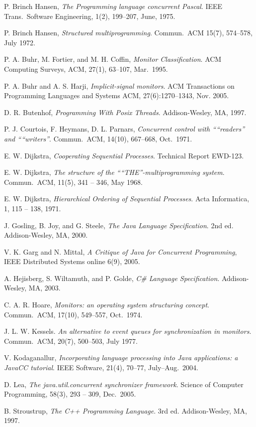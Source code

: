 \documentclass[preprint]{sigplanconf}
\begin{document}
\begin{thebibliography}{}
\softraggedright

  P. Brinch Hansen, \emph{The Programming language concurrent Pascal}. IEEE
  Trans.~Software Engineering, 1(2), 199--207, June, 1975.

    P. Brinch Hansen, \emph{Structured multiprogramming}. Commun.~ACM 15(7),
    574--578, July 1972.

  P. A. Buhr, M. Fortier, and M. H. Coffin, \emph{Monitor Classification}. ACM 
  Computing Surveys, ACM, 27(1), 63--107, 
  Mar.~1995.
  
  P. A. Buhr and A. S. Harji, \emph{Implicit-signal monitors}. ACM 
  Transactions on Programming Languages and Systems ACM, 27(6):1270--1343, 
  Nov. 2005.

  D. R. Butenhof, \emph{Programming With Posix Threads}.
  Addison-Wesley, MA, 1997.

    P. J. Courtois, F. Heymans, D. L. Parnars, \emph{Concurrent control with
    “``readers'' and “``writers''}. Commun.~ACM, 14(10), 667--668, Oct.~1971.

    E. W. Dijkstra, \emph{Cooperating Sequential Processes}.  Technical Report
    EWD-123. 
    
    E. W. Dijkstra, \emph{The structure of the “``THE''-multiprogramming
    system}. Commun.~ACM, 11(5), 341 -- 346, May 1968. 

    E. W. Dijkstra, \emph{Hierarchical Ordering of Sequential Processes}. Acta
    Informatica, 1, 115 -- 138, 1971.

    J. Gosling, B. Joy, and G. Steele, \emph{The Java Language Specification}.
    2nd ed. Addison-Wesley, MA, 2000. 

    V. K. Garg and N. Mittal, \emph{A Critique of Java for Concurrent
    Programming}, IEEE Distributed Systems online 6(9), 2005.

    A. Hejisberg, S. Wiltamuth, and P. Golde, \emph{C\# Language
    Specification}. Addison-Wesley, MA, 2003.

  C. A. R. Hoare, \emph{Monitors: an operating system structuring concept}. 
  Commun.~ACM, 17(10), 549--557, Oct.~1974. 

    J. L. W. Kessels. \emph{An alternative to event queues for synchronization 
    in monitors}. Commun.~ACM, 20(7), 500--503, July 1977.
  
    V. Kodaganallur, \emph{Incorporating language processing into Java 
    applications: a JavaCC tutorial}. IEEE Software, 21(4), 70--77,
    July--Aug.~2004. 

    D. Lea, \emph{The java.util.concurrent synchronizer framework}. Science of 
    Computer Programming, 58(3), 293 -- 309, Dec.~2005.

    B. Stroustrup, \emph{The C++ Programming Language}. 3rd ed. Addison-Wesley,
    MA, 1997.

\end{thebibliography}
\end{document}
